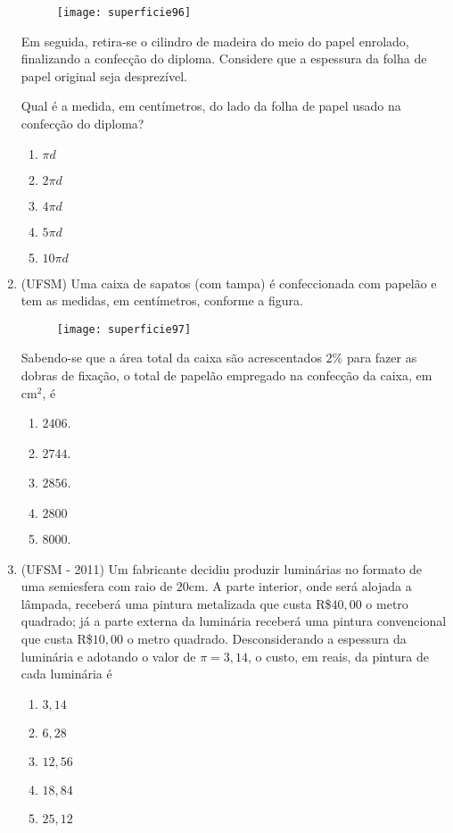 \begin{enumerate}
\begin{figure}[H]
  \texttt{[image: superficie96]}
  \end{figure}

  Em seguida, retira-se o cilindro de madeira do meio do  papel enrolado, finalizando a confecção do diploma. Considere que a espessura da folha de papel original seja desprezível.
\clearpage

  Qual é a medida, em centímetros, do lado da folha de papel usado na confecção do diploma?

  \begin{enumerate}
    \item $\pi d$ 
    \item $2\pi d$
    \item $4\pi d$
    \item $5\pi d$ 
    \item $10\pi d$
  \end{enumerate}

  \item (UFSM) Uma caixa de sapatos (com tampa) é confeccionada com papelão e tem as medidas, em centímetros, conforme a figura.

  \begin{figure}[H]
  \centering

  \texttt{[image: superficie97]}
  \end{figure}

  Sabendo-se que a área total da caixa são acrescentados $2\%$ para fazer as dobras de fixação, o total de papelão empregado na confecção da caixa, em cm$^2$, é
  \begin{enumerate}
    \item $2406$.
    \item $2744$.
    \item $2856$.
    \item $2800$
    \item $8000$.
  \end{enumerate}

\clearpage
  \item (UFSM - 2011) Um fabricante decidiu produzir luminárias no formato de uma semiesfera com raio de $20$cm. A parte interior, onde será alojada a lâmpada, receberá uma pintura metalizada que custa R\$$40{,}00$ o metro quadrado; já a parte externa da luminária receberá uma pintura convencional que custa R\$$10{,}00$ o metro quadrado. Desconsiderando a espessura da luminária e adotando o valor de $\pi=3{,}14$, o custo, em reais, da pintura de cada luminária é

  \begin{enumerate}
    \item $3{,}14$
    \item $6{,}28$
    \item $12{,}56$
    \item $18{,}84$
    \item $25{,}12$
  \end{enumerate}


\end{enumerate}
